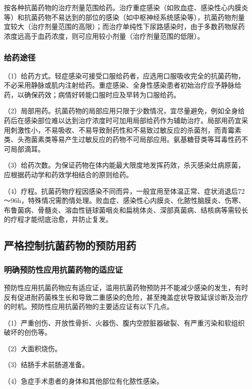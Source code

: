 按各种抗菌药物的治疗剂量范围给药。治疗重症感染（如败血症、感染性心内膜炎等）和抗菌药物不易达到的部位的感染（如中枢神经系统感染等），抗菌药物剂量宜较大（治疗剂量范围的高限）；而治疗单纯性下尿路感染时，由于多数药物尿药浓度远高于血药浓度，则可应用较小剂量（治疗剂量范围的低限）。

\subsubsection{给药途径}

（1）给药方式。轻症感染可接受口服给药者，应选用口服吸收完全的抗菌药物，不必采用静脉或肌内注射给药。重症感染、全身性感染患者初始治疗应予静脉给药，以确保药效；病情好转能口服时应及早转为口服给药。

（2）局部用药。抗菌药物的局部应用只限于少数情况，宜尽量避免，例如全身给药后在感染部位难以达到治疗浓度时可加用局部给药作为辅助治疗。局部用药宜采用刺激性小，不易吸收、不易导致耐药性和不易致过敏反应的杀菌剂，而青霉素类、头孢菌素类等易产生过敏反应的药物不可局部应用。氨基糖苷类等耳毒性药不可局部滴耳。

（3）给药次数。为保证药物在体内能最大限度地发挥药效，杀灭感染灶病原菌，应根据药动学和药效学相结合的原则给药。

（4）疗程。抗菌药物疗程因感染不同而异，一般宜用至体温正常、症状消退后72～96h，特殊情况需酌情处理。败血症、感染性心内膜炎、化脓性脑膜炎、伤寒、布鲁菌病、骨髓炎、溶血性链球菌咽炎和扁桃体炎、深部真菌病、结核病等需较长的疗程才能彻底治愈，并防止复发。

\subsection{严格控制抗菌药物的预防用药}

\subsubsection{明确预防性应用抗菌药物的适应证}

预防性应用抗菌药物应有适应证，滥用抗菌药物预防并不能减少感染的发生，有时反有促进耐药菌株生长和导致二重感染的危险，甚至掩盖症状导致延误诊断及治疗的时机。预防性应用抗菌药物的主要适应证有以下几点。

（1）严重创伤、开放性骨折、火器伤、腹内空腔脏器破裂、有严重污染和软组织破坏的创伤等。

（2）大面积烧伤。

（3）结肠手术前肠道准备。

（4）急症手术患者的身体和其他部位有化脓性感染。

